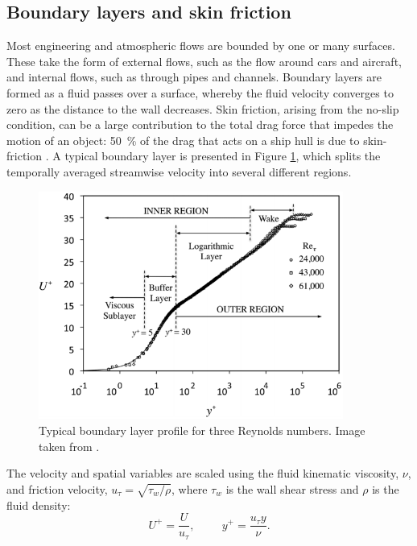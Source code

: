\documentclass[12pt,oneside,a4paper]{article}
\begin{document}
\subsection{Boundary layers and skin friction}
Most engineering and atmospheric flows are bounded by one or many surfaces. These take the form of external flows, such as the flow around cars and aircraft, and internal flows, such as through pipes and channels. Boundary layers are formed as a fluid passes over a surface, whereby the fluid velocity converges to zero as the distance to the wall decreases. Skin friction, arising from the no-slip condition, can be a large contribution to the total drag force that impedes the motion of an object: \SI{50}{\%} of the drag that acts on a ship hull is due to skin-friction \citep{perlin2016}. A typical boundary layer is presented in Figure \ref{figure:literatureReview:boundaryLayerRegions}, which splits the temporally averaged streamwise velocity into several different regions.
%
\begin{figure}[!b]
\centering
\includegraphics[width=10cm]{images/litReview/boundaryLayerRegions.png}
\caption{Typical boundary layer profile for three Reynolds numbers. Image taken from \cite{perlin2016}. }
\label{figure:literatureReview:boundaryLayerRegions}
\end{figure}
%
The velocity and spatial variables are scaled using the fluid kinematic viscosity, $\nu$, and friction velocity, $u_\tau = \sqrt{\tau_w / \rho}$, where $\tau_w$ is the wall shear stress and $\rho$ is the fluid density:
\begin{equation}
U^+ = \frac{U}{u_\tau}, \hspace{1cm} y^+ = \frac{u_\tau y }{\nu}.
\end{equation}
\end{document}
